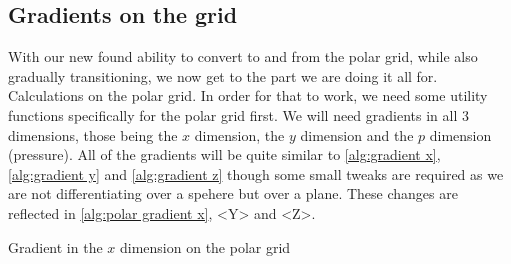 \subsection{Gradients on the grid}
With our new found ability to convert to and from the polar grid, while also gradually transitioning, we now get to the part we are doing it all for. Calculations on the polar grid. In order for
that to work, we need some utility functions specifically for the polar grid first. We will need gradients in all 3 dimensions, those being the $x$ dimension, the $y$ dimension and the $p$ 
dimension (pressure). All of the gradients will be quite similar to \autoref{alg:gradient x}, \autoref{alg:gradient y} and \autoref{alg:gradient z} though some small tweaks are required as we 
are not differentiating over a spehere but over a plane. These changes are reflected in \autoref{alg:polar gradient x}, <Y> and <Z>.

\begin{algorithm}
    \caption{Gradient in the $x$ dimension on the polar grid}
    \label{alg:polar gradient x}
      
\end{algorithm}